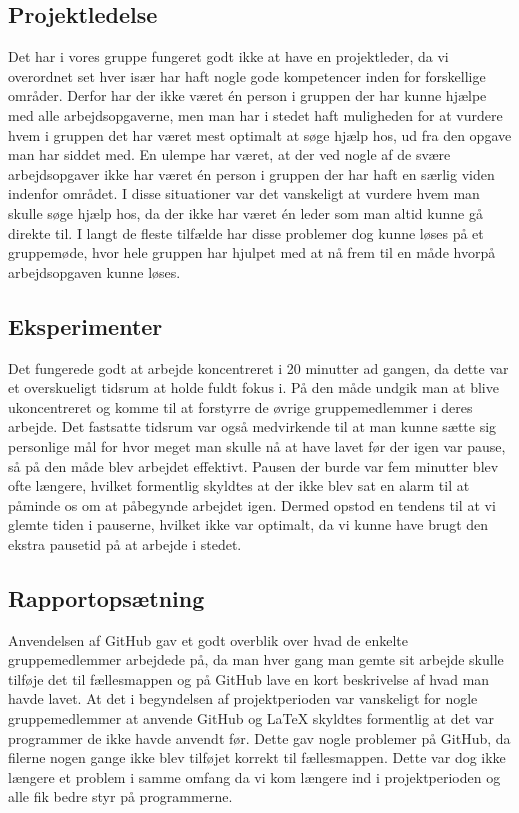 \subsection{Projektledelse}
Det har i vores gruppe fungeret godt ikke at have en projektleder, da vi overordnet set hver især har haft nogle gode kompetencer inden for forskellige områder. Derfor har der ikke været én person i gruppen der har kunne hjælpe med alle arbejdsopgaverne, men man har i stedet haft muligheden for at vurdere hvem i gruppen det har været mest optimalt at søge hjælp hos, ud fra den opgave man har siddet med. 
En ulempe har været, at der ved nogle af de svære arbejdsopgaver ikke har været én person i gruppen der har haft en særlig viden indenfor området. I disse situationer var det vanskeligt at vurdere hvem man skulle søge hjælp hos, da der ikke har været én leder som man altid kunne gå direkte til. I langt de fleste tilfælde har disse problemer dog kunne løses på et gruppemøde, hvor hele gruppen har hjulpet med at nå frem til en måde hvorpå arbejdsopgaven kunne løses.

\subsection{Eksperimenter}
Det fungerede godt at arbejde koncentreret i 20 minutter ad gangen, da dette var et overskueligt tidsrum at holde fuldt fokus i. På den måde undgik man at blive ukoncentreret og komme til at forstyrre de øvrige gruppemedlemmer i deres arbejde. Det fastsatte tidsrum var også medvirkende til at man kunne sætte sig personlige mål for hvor meget man skulle nå at have lavet før der igen var pause, så på den måde blev arbejdet effektivt. 
Pausen der burde var fem minutter blev ofte længere, hvilket formentlig skyldtes at der ikke blev sat en alarm til at påminde os om at påbegynde arbejdet igen. Dermed opstod en tendens til at vi glemte tiden i pauserne, hvilket ikke var optimalt, da vi kunne have brugt den ekstra pausetid på at arbejde i stedet.

\subsection{Rapportopsætning}
Anvendelsen af GitHub gav et godt overblik over hvad de enkelte gruppemedlemmer arbejdede på, da man hver gang man gemte sit arbejde skulle tilføje det til fællesmappen og på GitHub lave en kort beskrivelse af hvad man havde lavet. 
At det i begyndelsen af projektperioden var vanskeligt for nogle gruppemedlemmer at anvende GitHub og LaTeX skyldtes formentlig at det var programmer de ikke havde anvendt før. Dette gav nogle problemer på GitHub, da filerne nogen gange ikke blev tilføjet korrekt til fællesmappen. Dette var dog ikke længere et problem i samme omfang da vi kom længere ind i projektperioden og alle fik bedre styr på programmerne. 